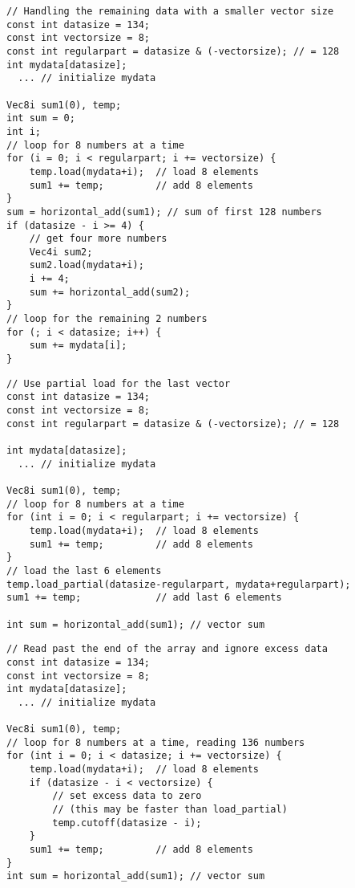 \documentclass[vcl_manual.tex]{subfiles}
\begin{document}
\begin{example}
\label{exampleOddLoop2}
\end{example}
\begin{lstlisting}[frame=single]
// Handling the remaining data with a smaller vector size
const int datasize = 134;
const int vectorsize = 8;
const int regularpart = datasize & (-vectorsize); // = 128
int mydata[datasize];
  ... // initialize mydata

Vec8i sum1(0), temp;
int sum = 0;
int i;
// loop for 8 numbers at a time
for (i = 0; i < regularpart; i += vectorsize) {
    temp.load(mydata+i);  // load 8 elements
    sum1 += temp;         // add 8 elements
}
sum = horizontal_add(sum1); // sum of first 128 numbers
if (datasize - i >= 4) {
    // get four more numbers
    Vec4i sum2;
    sum2.load(mydata+i);
    i += 4;
    sum += horizontal_add(sum2); 
}
// loop for the remaining 2 numbers
for (; i < datasize; i++) {
    sum += mydata[i];
}
\end{lstlisting}


\begin{example}
\label{exampleOddLoop3}
\end{example}
\begin{lstlisting}[frame=single]
// Use partial load for the last vector
const int datasize = 134;
const int vectorsize = 8;
const int regularpart = datasize & (-vectorsize); // = 128

int mydata[datasize];
  ... // initialize mydata

Vec8i sum1(0), temp;
// loop for 8 numbers at a time
for (int i = 0; i < regularpart; i += vectorsize) {
    temp.load(mydata+i);  // load 8 elements
    sum1 += temp;         // add 8 elements
}
// load the last 6 elements
temp.load_partial(datasize-regularpart, mydata+regularpart);
sum1 += temp;             // add last 6 elements

int sum = horizontal_add(sum1); // vector sum
\end{lstlisting}


\begin{example}
\label{exampleOddLoop4}
\end{example}
\begin{lstlisting}[frame=single]
// Read past the end of the array and ignore excess data
const int datasize = 134;
const int vectorsize = 8;
int mydata[datasize];
  ... // initialize mydata

Vec8i sum1(0), temp;
// loop for 8 numbers at a time, reading 136 numbers
for (int i = 0; i < datasize; i += vectorsize) {
    temp.load(mydata+i);  // load 8 elements
    if (datasize - i < vectorsize) {
        // set excess data to zero
        // (this may be faster than load_partial)
        temp.cutoff(datasize - i);
    }
    sum1 += temp;         // add 8 elements
}
int sum = horizontal_add(sum1); // vector sum
\end{lstlisting}
\end{document}
